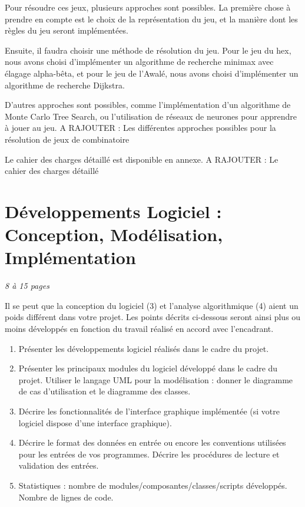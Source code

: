 \documentclass[a4paper]{article} %
\begin{document}
Pour résoudre ces jeux, plusieurs approches sont possibles.
La première chose à prendre en compte est le choix de la représentation du jeu,
et la manière dont les règles du jeu seront implémentées.

Ensuite, il faudra choisir une méthode de résolution du jeu.
Pour le jeu du hex, nous avons choisi d'implémenter un algorithme de recherche minimax avec élagage alpha-bêta,
et pour le jeu de l'Awalé, nous avons choisi d'implémenter un algorithme de recherche Dijkstra.

D'autres approches sont possibles, comme l'implémentation d'un algorithme de Monte Carlo Tree Search,
ou l'utilisation de réseaux de neurones pour apprendre à jouer au jeu.
A RAJOUTER : Les différentes approches possibles pour la résolution de jeux de combinatoire

Le cahier des charges détaillé est disponible en annexe.
A RAJOUTER : Le cahier des charges détaillé



\section{Développements Logiciel : Conception, Modélisation, Implémentation} 
\emph{8 à 15 pages}

Il se peut que la conception du logiciel (3) et l'analyse algorithmique (4) aient un poids différent dans votre projet. Les points décrits ci-dessous seront ainsi plus ou moins développés en fonction du travail réalisé en accord avec l'encadrant. 
\begin{enumerate}%
\item Présenter les développements logiciel réalisés dans le cadre du projet.
\item Présenter les principaux modules du logiciel développé dans le cadre du projet. Utiliser le langage UML pour la modélisation : donner le diagramme de cas d'utilisation et le diagramme des classes.
\item Décrire les fonctionnalités de l'interface graphique implémentée (si votre logiciel dispose d'une interface graphique).
\item Décrire le format des données en entrée ou encore les conventions utilisées pour les entrées de vos programmes. Décrire les procédures de lecture et validation des entrées.
\item Statistiques : nombre de modules/composantes/classes/scripts développés. Nombre de lignes de code.
\end{enumerate}
\end{document}
